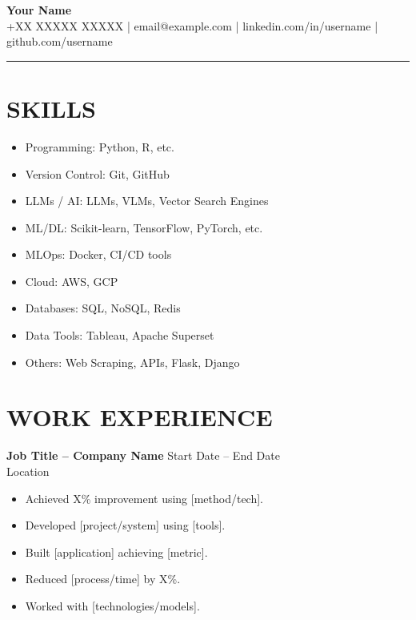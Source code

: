 \documentclass[a4paper,10pt]{article}
\begin{document}
\begin{center}
    {\LARGE \textbf{Your Name}}\\[5pt]
    +XX XXXXX XXXXX | email@example.com | linkedin.com/in/username | github.com/username
\end{center}

\vspace{5pt}
\hrule
\vspace{10pt}

\section*{SKILLS}
\begin{itemize}[leftmargin=*]
    \item Programming: Python, R, etc.
    \item Version Control: Git, GitHub
    \item LLMs / AI: LLMs, VLMs, Vector Search Engines
    \item ML/DL: Scikit-learn, TensorFlow, PyTorch, etc.
    \item MLOps: Docker, CI/CD tools
    \item Cloud: AWS, GCP
    \item Databases: SQL, NoSQL, Redis
    \item Data Tools: Tableau, Apache Superset
    \item Others: Web Scraping, APIs, Flask, Django
\end{itemize}

\section*{WORK EXPERIENCE}

\textbf{Job Title – Company Name} \hfill Start Date – End Date\\
Location
\begin{itemize}[leftmargin=*]
    \item Achieved X\% improvement using [method/tech].
    \item Developed [project/system] using [tools].
    \item Built [application] achieving [metric].
    \item Reduced [process/time] by X\%.
    \item Worked with [technologies/models].
\end{itemize}
\end{document}
